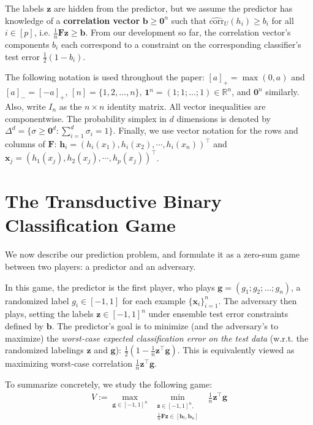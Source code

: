 \documentclass{article}
\newcommand{\RR}{\mathbb{R}}      %
\newcommand{\lrp}[1]{\left(#1\right)}
\newcommand{\corr}{\mbox{corr}}
\newcommand{\vF}{\mathbf{F}}
\newcommand{\vh}{\mathbf{h}}
\newcommand{\vx}{\mathbf{x}}
\newcommand{\vb}{\mathbf{b}}
\newcommand{\vg}{\mathbf{g}}
\newcommand{\vz}{\mathbf{z}}
\newcommand{\vzero}{\mathbf{0}}
\newcommand{\vone}{\mathbf{1}}
\begin{document}
The labels $\vz$ are hidden from the predictor, 
but we assume the predictor has knowledge of a {\bf correlation vector}
$\vb \geq \vzero^n$ such that $\widehat{\corr}_{U} (h_i) \geq b_i$ for all $i \in [p]$, 
i.e. $ \frac{1}{n} \vF \vz \geq \vb$. 
From our development so far, the correlation vector's components $b_i$ each correspond 
to a constraint on the corresponding classifier's test error $\frac{1}{2} (1 - b_i)$. 

The following notation is used throughout the paper: $[a]_{+} = \max (0, a)$ and $[a]_{-} = [-a]_{+}$,  
$[n] = \{ 1,2,\dots,n \}$, $\vone^n = (1; 1; \dots; 1) \in \RR^n$, and $\vzero^n$
similarly.  Also, write $I_n$ as the $n \times n$ identity matrix.
All vector inequalities are componentwise. 
The probability simplex in $d$ dimensions is denoted by $\Delta^d = \{ \sigma \geq \vzero^d : \sum_{i=1}^d \sigma_i = 1 \}$.
Finally, we use vector notation for the rows and columns of $\vF$: 
$\vh_i = (h_i(x_1), h_i(x_2), \cdots, h_i (x_n))^\top$ and $\vx_j =
(h_1(x_j), h_2(x_j), \cdots, h_p (x_j))^\top$.


\section{The Transductive Binary Classification Game}
\label{sec:game1}

We now describe our prediction problem, and formulate it as a zero-sum game between 
two players: a predictor and an adversary.

In this game, the predictor is the first player, 
who plays $\vg = (g_1; g_2; \dots; g_n)$, 
a randomized label $g_i \in [-1,1]$ for each example $\{\vx_i\}_{i=1}^{n}$. 
The adversary then plays, setting the labels $\vz \in [-1,1]^n$ 
under ensemble test error constraints defined by $\vb$. 
The predictor's goal is to minimize (and the adversary's to maximize) 
the \emph{worst-case expected classification error on the test data} 
(w.r.t. the randomized labelings $\vz$ and $\vg$): 
$\frac{1}{2} \lrp{1 - \frac{1}{n} \vz^\top \vg }$. 
This is equivalently viewed as maximizing worst-case correlation $\frac{1}{n} \vz^\top \vg $. 

To summarize concretely, we study the following game:
\begin{align}
\label{game1eq}
\displaystyle 
V := \max_{\vg \in [-1,1]^n} \; \min_{\substack{ \vz \in [-1,1]^n ,
    \\ \frac{1}{n} \vF \vz \in [\vb_l,\vb_u] }} \;\; \frac{1}{n} \vz^\top \vg
\end{align}
\end{document}
